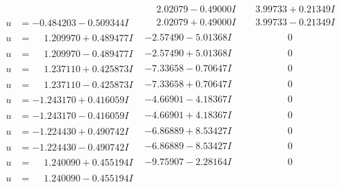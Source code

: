 \documentclass[1p]{elsarticle_modified}
\theoremstyle{definition}
\begin{document}
$$\begin{array}{c|c|c}
 & \phantom{-}2.02079 - 0.49000 I & \phantom{-}3.99733 + 0.21349 I \\ \hline\begin{aligned}
u &= -0.484203 - 0.509344 I\end{aligned}
 & \phantom{-}2.02079 + 0.49000 I & \phantom{-}3.99733 - 0.21349 I \\ \hline\begin{aligned}
u &= \phantom{-}1.209970 + 0.489477 I\end{aligned}
 & -2.57490 - 5.01368 I & \phantom{-0.000000 } 0 \\ \hline\begin{aligned}
u &= \phantom{-}1.209970 - 0.489477 I\end{aligned}
 & -2.57490 + 5.01368 I & \phantom{-0.000000 } 0 \\ \hline\begin{aligned}
u &= \phantom{-}1.237110 + 0.425873 I\end{aligned}
 & -7.33658 - 0.70647 I & \phantom{-0.000000 } 0 \\ \hline\begin{aligned}
u &= \phantom{-}1.237110 - 0.425873 I\end{aligned}
 & -7.33658 + 0.70647 I & \phantom{-0.000000 } 0 \\ \hline\begin{aligned}
u &= -1.243170 + 0.416059 I\end{aligned}
 & -4.66901 - 4.18367 I & \phantom{-0.000000 } 0 \\ \hline\begin{aligned}
u &= -1.243170 - 0.416059 I\end{aligned}
 & -4.66901 + 4.18367 I & \phantom{-0.000000 } 0 \\ \hline\begin{aligned}
u &= -1.224430 + 0.490742 I\end{aligned}
 & -6.86889 + 8.53427 I & \phantom{-0.000000 } 0 \\ \hline\begin{aligned}
u &= -1.224430 - 0.490742 I\end{aligned}
 & -6.86889 - 8.53427 I & \phantom{-0.000000 } 0 \\ \hline\begin{aligned}
u &= \phantom{-}1.240090 + 0.455194 I\end{aligned}
 & -9.75907 - 2.28164 I & \phantom{-0.000000 } 0 \\ \hline\begin{aligned}
u &= \phantom{-}1.240090 - 0.455194 I\end{aligned}

\end{array}$$
\end{document}
